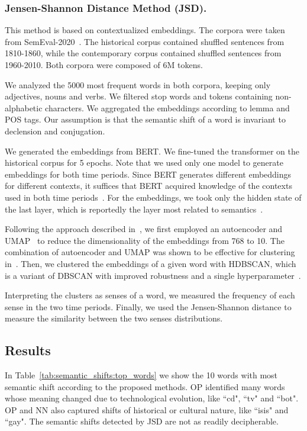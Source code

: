 \documentclass[runningheads]{llncs}
\begin{document}
\subsubsection{Jensen-Shannon Distance Method (JSD).} This method is based on contextualized embeddings. The corpora were taken from SemEval-2020~\cite{schlechtweg-etal-2020-semeval}. The historical corpus contained shuffled sentences from 1810-1860, while the contemporary corpus contained shuffled sentences from 1960-2010. Both corpora were composed of 6M tokens.

We analyzed the 5000 most frequent words in both corpora, keeping only adjectives, nouns and verbs. We filtered stop words and tokens containing non-alphabetic characters. We aggregated the embeddings according to lemma and POS tags. Our assumption is that the semantic shift of a word is invariant to declension and conjugation.

We generated the embeddings from BERT. We fine-tuned the transformer on the historical corpus for 5 epochs. Note that we used only one model to generate embeddings for both time periods. Since BERT generates different embeddings for different contexts, it suffices that BERT acquired knowledge of the contexts used in both time periods~\cite{martinc-etal-2020-leveraging}. For the embeddings, we took only the hidden state of the last layer, which is reportedly the layer most related to semantics~\cite{laicher-etal-2021-explaining}.

Following the approach described in~\cite{rother-etal-2020-cmce}, we first employed an autoencoder and UMAP~\cite{mcinnes-2020-umap} to reduce the dimensionality of the embeddings from 768 to 10. The combination of autoencoder and UMAP was shown to be effective for clustering in~\cite{mcconville-etal-2019-n2d}. Then, we clustered the embeddings of a given word with HDBSCAN, which is a variant of DBSCAN with improved robustness and a single hyperparameter~\cite{campello-etal-2013-hdbscan}. 

Interpreting the clusters as senses of a word, we measured the frequency of each sense in the two time periods. Finally, we used the Jensen-Shannon distance to measure the similarity between the two senses distributions.

\subsection{Results}
\label{subsec:semantic_shifts:results}

In Table~\ref{tab:semantic_shifts:top_words} we show the 10 words with most semantic shift according to the proposed methods. OP identified many words whose meaning changed due to technological evolution, like “cd", “tv" and “bot". OP and NN also captured shifts of historical or cultural nature, like “isis" and “gay". The semantic shifts detected by JSD are not as readily decipherable.
\end{document}
